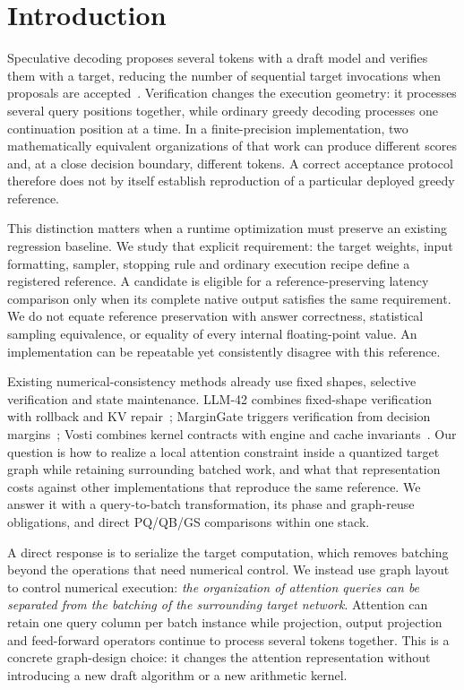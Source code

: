 \section{Introduction}
\label{sec:intro}
Speculative decoding proposes several tokens with a draft model and verifies them with a target, reducing the number of sequential target invocations when proposals are accepted~\cite{leviathan2023}. Verification changes the execution geometry: it processes several query positions together, while ordinary greedy decoding processes one continuation position at a time. In a finite-precision implementation, two mathematically equivalent organizations of that work can produce different scores and, at a close decision boundary, different tokens. A correct acceptance protocol therefore does not by itself establish reproduction of a particular deployed greedy reference.

This distinction matters when a runtime optimization must preserve an existing regression baseline. We study that explicit requirement: the target weights, input formatting, sampler, stopping rule and ordinary execution recipe define a registered reference. A candidate is eligible for a reference-preserving latency comparison only when its complete native output satisfies the same requirement. We do not equate reference preservation with answer correctness, statistical sampling equivalence, or equality of every internal floating-point value. An implementation can be repeatable yet consistently disagree with this reference.

Existing numerical-consistency methods already use fixed shapes, selective verification and state maintenance. LLM-42 combines fixed-shape verification with rollback and KV repair~\cite{llm42}; MarginGate triggers verification from decision margins~\cite{margingate}; Vosti combines kernel contracts with engine and cache invariants~\cite{vosti}. Our question is how to realize a local attention constraint inside a quantized target graph while retaining surrounding batched work, and what that representation costs against other implementations that reproduce the same reference. We answer it with a query-to-batch transformation, its phase and graph-reuse obligations, and direct PQ/QB/GS comparisons within one stack.

A direct response is to serialize the target computation, which removes batching beyond the operations that need numerical control. We instead use graph layout to control numerical execution: \emph{the organization of attention queries can be separated from the batching of the surrounding target network}. Attention can retain one query column per batch instance while projection, output projection and feed-forward operators continue to process several tokens together. This is a concrete graph-design choice: it changes the attention representation without introducing a new draft algorithm or a new arithmetic kernel.

